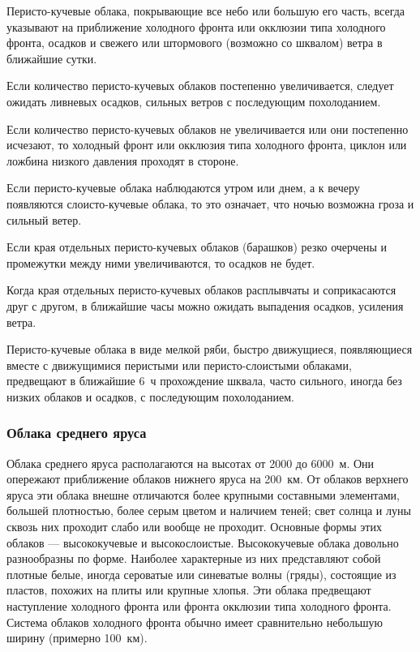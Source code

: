  Перисто-кучевые облака, покрывающие все небо или большую его
часть, всегда указывают на приближение холодного фронта или окклюзии
типа холодного фронта, осадков и свежего или штормового (возможно со
шквалом) ветра в ближайшие сутки.

 Если количество перисто-кучевых облаков постепенно
увеличивается, следует ожидать ливневых осадков, сильных ветров с
последующим похолоданием.

 Если количество перисто-кучевых облаков не увеличивается или
они постепенно исчезают, то холодный фронт или окклюзия типа холодного
фронта, циклон или ложбина низкого давления проходят в стороне.

 Если перисто-кучевые облака наблюдаются утром или днем, а к вечеру
появляются слоисто-кучевые облака, то это означает, что ночью возможна
гроза и сильный ветер.

 Если края отдельных перисто-кучевых облаков (барашков) резко
очерчены и промежутки между ними увеличиваются, то осадков не будет.

 Когда края отдельных перисто-кучевых облаков расплывчаты и
соприкасаются друг с другом, в ближайшие часы можно ожидать выпадения
осадков, усиления ветра.

 Перисто-кучевые облака в виде мелкой ряби, быстро движущиеся,
появляющиеся вместе с движущимися перистыми или перисто-слоистыми
облаками, предвещают в ближайшие 6~ч прохождение шквала, часто
сильного, иногда без низких облаков и осадков, с последующим
похолоданием.

\subsubsection{Облака среднего яруса}

Облака среднего яруса располагаются на высотах от 2000 до 6000~м. Они
опережают приближение облаков нижнего яруса на 200~км. От облаков
верхнего яруса эти облака внешне отличаются более крупными составными
элементами, большей плотностью, более серым цветом и наличием теней;
свет солнца и луны сквозь них проходит слабо или вообще не
проходит. Основные формы этих облаков --- высококучевые и
высокослоистые. Высококучевые облака довольно разнообразны по
форме. Наиболее характерные из них представляют собой плотные белые,
иногда сероватые или синеватые волны (гряды), состоящие из пластов,
похожих на плиты или крупные хлопья. Эти облака предвещают наступление
холодного фронта или фронта окклюзии типа холодного фронта. Система
облаков холодного фронта обычно имеет сравнительно небольшую ширину
(примерно 100~км).

